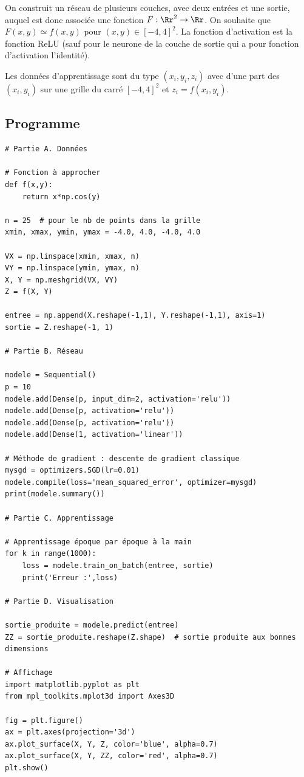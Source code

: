 \documentclass[11pt,class=report,crop=false]{standalone}
\begin{document}
On construit un réseau de plusieurs couches, avec deux entrées et une sortie, auquel est donc associée une fonction $F : \Rr^2 \to \Rr$. On souhaite que $F(x,y) \simeq f(x,y)$ 
pour $(x,y) \in [-4,4]^2$. La fonction d'activation est la fonction \og{}ReLU\fg{} (sauf pour le neurone de la couche de sortie qui a pour fonction d'activation l'identité).



Les données d'apprentissage sont du type $(x_i,y_i,z_i)$ avec d'une part des $(x_i,y_i)$ sur une grille du carré $[-4,4]^2$ et $z_i = f(x_i,y_i)$.


\subsection{Programme}

\begin{lstlisting}
# Partie A. Données

# Fonction à approcher
def f(x,y):
    return x*np.cos(y)

n = 25  # pour le nb de points dans la grille
xmin, xmax, ymin, ymax = -4.0, 4.0, -4.0, 4.0

VX = np.linspace(xmin, xmax, n)
VY = np.linspace(ymin, ymax, n)
X, Y = np.meshgrid(VX, VY)
Z = f(X, Y)

entree = np.append(X.reshape(-1,1), Y.reshape(-1,1), axis=1)
sortie = Z.reshape(-1, 1)

# Partie B. Réseau 

modele = Sequential()
p = 10
modele.add(Dense(p, input_dim=2, activation='relu'))
modele.add(Dense(p, activation='relu'))
modele.add(Dense(p, activation='relu'))
modele.add(Dense(1, activation='linear'))

# Méthode de gradient : descente de gradient classique
mysgd = optimizers.SGD(lr=0.01)
modele.compile(loss='mean_squared_error', optimizer=mysgd)
print(modele.summary())

# Partie C. Apprentissage

# Apprentissage époque par époque à la main
for k in range(1000):
    loss = modele.train_on_batch(entree, sortie)
    print('Erreur :',loss)

# Partie D. Visualisation

sortie_produite = modele.predict(entree)
ZZ = sortie_produite.reshape(Z.shape)  # sortie produite aux bonnes dimensions

# Affichage
import matplotlib.pyplot as plt
from mpl_toolkits.mplot3d import Axes3D

fig = plt.figure()
ax = plt.axes(projection='3d')
ax.plot_surface(X, Y, Z, color='blue', alpha=0.7)
ax.plot_surface(X, Y, ZZ, color='red', alpha=0.7)
plt.show()
\end{lstlisting}
\end{document}
